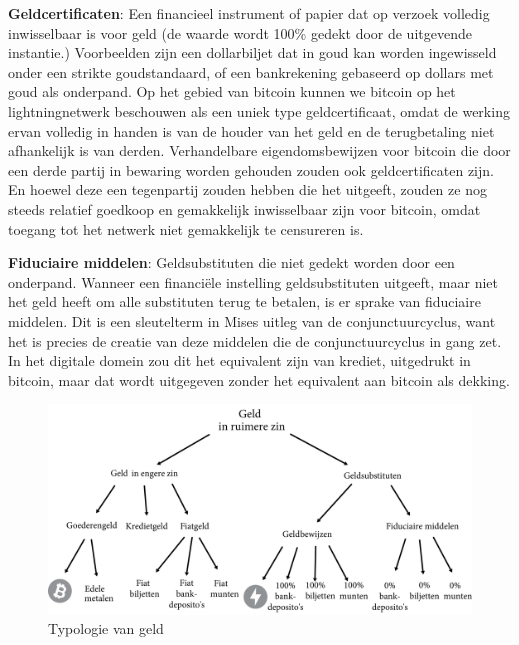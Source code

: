 \vspace{1em}\noindent\textbf{Geldcertificaten}: Een financieel instrument of papier dat op verzoek volledig inwisselbaar is voor geld (de waarde wordt 100\% gedekt door de uitgevende instantie.) Voorbeelden zijn een dollarbiljet dat in goud kan worden ingewisseld onder een strikte goudstandaard, of een bankrekening gebaseerd op dollars met goud als onderpand. Op het gebied van bitcoin kunnen we bitcoin op het lightningnetwerk beschouwen als een uniek type geldcertificaat, omdat de werking ervan volledig in handen is van de houder van het geld en de terugbetaling niet afhankelijk is van derden. Verhandelbare eigendomsbewijzen voor bitcoin die door een derde partij in bewaring worden gehouden zouden ook geldcertificaten zijn. En hoewel deze een tegenpartij zouden hebben die het uitgeeft, zouden ze nog steeds relatief goedkoop en gemakkelijk inwisselbaar zijn voor bitcoin, omdat toegang tot het netwerk niet gemakkelijk te censureren is.

\vspace{1em}\noindent\textbf{Fiduciaire middelen}: Geldsubstituten die niet gedekt worden door een onderpand. Wanneer een financiële instelling geldsubstituten uitgeeft, maar niet het geld heeft om alle substituten terug te betalen, is er sprake van fiduciaire middelen. Dit is een sleutelterm in Mises\textquotesingle{} uitleg van de conjunctuurcyclus, want het is precies de creatie van deze middelen die de conjunctuurcyclus in gang zet. In het digitale domein zou dit het equivalent zijn van krediet, uitgedrukt in bitcoin, maar dat wordt uitgegeven zonder het equivalent aan bitcoin als dekking.

\begin{figure}[H]
\centering
    \includegraphics[width=\textwidth]{figures/fig31.pdf}
    \caption[Typologie van geld]{Typologie van geld\footnotemark}
    \label{fig31}
\end{figure}

